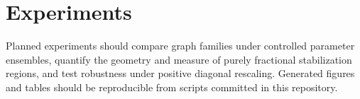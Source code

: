 \section{Experiments}
Planned experiments should compare graph families under controlled parameter ensembles, quantify the geometry and measure of purely fractional stabilization regions, and test robustness under positive diagonal rescaling. Generated figures and tables should be reproducible from scripts committed in this repository.
